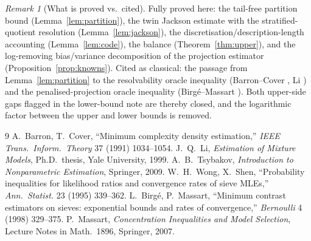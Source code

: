 \documentclass[11pt]{article}
\theoremstyle{plain}
\theoremstyle{definition}
\theoremstyle{remark}
\newtheorem{remark}[theorem]{Remark}
\begin{document}
\begin{remark}[What is proved vs.\ cited]
Fully proved here: the tail-free partition bound (Lemma~\ref{lem:partition}), the
twin Jackson estimate with the stratified-quotient resolution
(Lemma~\ref{lem:jackson}), the discretisation/description-length accounting
(Lemma~\ref{lem:code}), the balance (Theorem~\ref{thm:upper}), and the
log-removing bias/variance decomposition of the projection estimator
(Proposition~\ref{prop:knowns}). Cited as classical: the passage from
Lemma~\ref{lem:partition} to the resolvability oracle inequality (Barron--Cover
\cite{barroncover}, Li \cite{li}) and the penalised-projection oracle inequality
(Birg\'e--Massart \cite{birgemassart98,massart}). Both upper-side gaps flagged in
the lower-bound note are thereby closed, and the logarithmic factor between the
upper and lower bounds is removed.
\end{remark}

\begin{thebibliography}{9}
 A.~Barron, T.~Cover, ``Minimum complexity density
estimation,'' \emph{IEEE Trans.\ Inform.\ Theory} 37 (1991) 1034--1054.
 J.~Q.~Li, \emph{Estimation of Mixture Models}, Ph.D.\ thesis, Yale
University, 1999.
 A.~B.~Tsybakov, \emph{Introduction to Nonparametric
Estimation}, Springer, 2009.
 W.~H.~Wong, X.~Shen, ``Probability inequalities for likelihood
ratios and convergence rates of sieve MLEs,'' \emph{Ann.\ Statist.} 23 (1995)
339--362.
 L.~Birg\'e, P.~Massart, ``Minimum contrast estimators on
sieves: exponential bounds and rates of convergence,'' \emph{Bernoulli} 4 (1998)
329--375.
 P.~Massart, \emph{Concentration Inequalities and Model
Selection}, Lecture Notes in Math.\ 1896, Springer, 2007.
\end{thebibliography}
\end{document}
